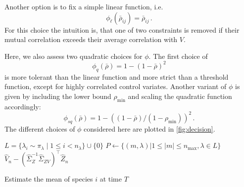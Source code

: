 Another option is to fix a simple linear function, i.e.\ $$ \phi_{\ell}(\bar\rho_{ij})=\bar\rho_{ij}\,.$$
For this choice the intuition is, that one of two constraints is removed if their mutual
correlation exceeds their average correlation with $V$.


Here, we also assess two quadratic choices for $\phi$. The first choice of
$$
	\phi_{q}(\bar\rho)=1 - (1-\bar\rho)^2
	$$
is more tolerant than the linear function and more strict than a threshold function, except for
highly correlated control  variates.
Another variant of $\phi$ is given by including the lower bound $\rho_{\min}$ and scaling
the quadratic function accordingly:
$$ \phi_{\mathit{sq}}(\bar\rho)=1-((1-\bar\rho)/(1-\rho_{\min}))^2\,.$$
The different choices of $\phi$ considered here are plotted in \autoref{fig:decision}.


\begin{algorithm}[t]

  $L=\{\lambda_i\sim \pi_\lambda \mid 1\leq i< n_{\lambda} \} \cup \{ 0 \}$\label{line:lambda_sample}\;
  $P \leftarrow \{ ({m}, \lambda) | 1\leq\lvert {m} \rvert \leq n_{\max}, \lambda\in L\}$\label{line:init_covs}\;
\Return $\hat{V}_n - {(\hat{\Sigma}_{{Z}}^{-1}\hat\Sigma_{{Z}V})}^{\top}\hat{{Z}}_n$\label{line:compute_lcv}\;
    \caption{\label{alg:ssa:lcv}Estimate the mean of species $i$ at time $T$}
\end{algorithm}



